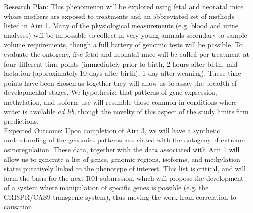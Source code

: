 \documentclass[11pt]{article}
\begin{document}
Research Plan: This phenomenon will be explored using fetal and neonatal mice whose mothers are exposed to treatments and an abbreviated set of methods listed in Aim 1. Many of the physiological measurements  (e.g. blood and urine analyses) will be impossible to collect in very young animals secondary to sample volume requirements, though a full battery of genomic tests will be possible. To evaluate the ontogeny, five fetal and neonatal mice will be culled per treatment at four different time-points (immediately prior to birth, 2 hours after birth, mid-lactation (approximately 10 days after birth), 1 day after weaning). These time-points have been chosen as together they will allow us to assay the breadth of developmental stages.  We hypothesize that patterns of gene expression, methylation, and isoform use will resemble those common in conditions where water is available \textit{ad lib}, though the novelty of this aspect of the study limits firm predictions. \\

Expected Outcome: Upon completion of Aim 3, we will have a synthetic understanding of the genomics patterns associated with the ontogeny of extreme osmoregulation. These data, together with the data associated with Aim 1 will allow us to generate a list of genes, genomic regions, isoforms, and methylation states putatively linked to the phenotype of interest. This list is critical, and will form the basis for the next R01 submission, which will propose the development of a system where manipulation of specific genes is possible (e.g. the CRISPR/CAS9 transgenic system), thus moving the work from correlation to causation. 
\end{document}
